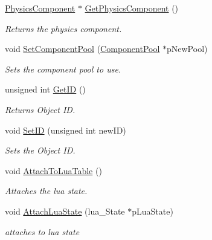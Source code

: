 \begin{DoxyCompactItemize}
\mbox{\label{class_game_object_a8b709e89ace9675b822b50bdd2ac879d}} 
\mbox{\hyperlink{struct_physics_component}{Physics\+Component}} $\ast$ \mbox{\hyperlink{class_game_object_a8b709e89ace9675b822b50bdd2ac879d}{Get\+Physics\+Component}} ()
\begin{DoxyCompactList}\small\item\em Returns the physics component. \end{DoxyCompactList}\item 
void \mbox{\hyperlink{class_game_object_ae232f791564f4bf504e0ede697be7f0d}{Set\+Component\+Pool}} (\mbox{\hyperlink{class_component_pool}{Component\+Pool}} $\ast$p\+New\+Pool)
\begin{DoxyCompactList}\small\item\em Sets the component pool to use. \end{DoxyCompactList}\item 
\mbox{\label{class_game_object_acc49d53385a1e3b344d59f177c09d91b}} 
unsigned int \mbox{\hyperlink{class_game_object_acc49d53385a1e3b344d59f177c09d91b}{Get\+ID}} ()
\begin{DoxyCompactList}\small\item\em Returns Object ID. \end{DoxyCompactList}\item 
\mbox{\label{class_game_object_af8b86b903fa6133147beecd900d4cb68}} 
void \mbox{\hyperlink{class_game_object_af8b86b903fa6133147beecd900d4cb68}{Set\+ID}} (unsigned int new\+ID)
\begin{DoxyCompactList}\small\item\em Sets the Object ID. \end{DoxyCompactList}\item 
\mbox{\label{class_game_object_aacd344875d0bee0c5a95af28305aa94a}} 
void \mbox{\hyperlink{class_game_object_aacd344875d0bee0c5a95af28305aa94a}{Attach\+To\+Lua\+Table}} ()
\begin{DoxyCompactList}\small\item\em Attaches the lua state. \end{DoxyCompactList}\item 
\mbox{\label{class_game_object_ac01455f6ad0b0b4bc3e6c51c6624fde4}} 
void \mbox{\hyperlink{class_game_object_ac01455f6ad0b0b4bc3e6c51c6624fde4}{Attach\+Lua\+State}} (lua\+\_\+\+State $\ast$p\+Lua\+State)
\begin{DoxyCompactList}\small\item\em attaches to lua state \end{DoxyCompactList}\end{DoxyCompactItemize}
